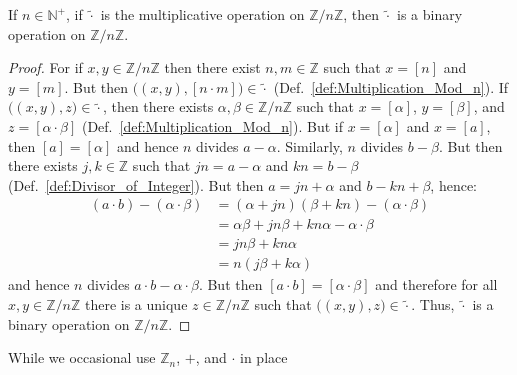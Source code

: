 \documentclass{article}                                                        %
\begin{document}
            \begin{theorem}
                \label{thm:Mult_Mod_n_is_Bin_Op}%
                If $n\in\mathbb{N}^{+}$, if $\tilde{\cdot}$ is the
                multiplicative operation on $\mathbb{Z}/n\mathbb{Z}$, then
                $\tilde{\cdot}$ is a binary operation on
                $\mathbb{Z}/n\mathbb{Z}$.
            \end{theorem}
            \begin{proof}
                For if $x,y\in\mathbb{Z}/n\mathbb{Z}$ then there exist
                $n,m\in\mathbb{Z}$ such that $x=[n]$ and $y=[m]$. But then
                $\big((x,y),[n\cdot{m}]\big)\in\tilde{\cdot}$
                (Def.~\ref{def:Multiplication_Mod_n}). If
                $\big((x,y),z\big)\in\tilde{\cdot}$, then there exists
                $\alpha,\beta\in\mathbb{Z}/n\mathbb{Z}$ such that
                $x=[\alpha]$, $y=[\beta]$, and $z=[\alpha\cdot\beta]$
                (Def.~\ref{def:Multiplication_Mod_n}). But if $x=[\alpha]$ and
                $x=[a]$, then $[a]=[\alpha]$ and hence $n$ divides $a-\alpha$.
                Similarly, $n$ divides $b-\beta$. But then there exists
                $j,k\in\mathbb{Z}$ such that $jn=a-\alpha$ and $kn=b-\beta$
                (Def.~\ref{def:Divisor_of_Integer}). But then
                $a=jn+\alpha$ and $b-kn+\beta$, hence:
                \begin{subequations}
                    \begin{align}
                        (a\cdot{b})-(\alpha\cdot\beta)
                            &=(\alpha+jn)(\beta+kn)-(\alpha\cdot\beta)\\
                            &=\alpha\beta+jn\beta+kn\alpha-\alpha\cdot\beta\\
                            &=jn\beta+kn\alpha\\
                            &=n(j\beta+k\alpha)
                    \end{align}
                \end{subequations}
                and hence $n$ divides $a\cdot{b}-\alpha\cdot\beta$. But then
                $[a\cdot{b}]=[\alpha\cdot\beta]$ and therefore for all
                $x,y\in\mathbb{Z}/n\mathbb{Z}$ there is a unique
                $z\in\mathbb{Z}/n\mathbb{Z}$ such that
                $\big((x,y),z\big)\in\tilde{\cdot}$. Thus, $\tilde{\cdot}$ is a
                binary operation on $\mathbb{Z}/n\mathbb{Z}$.
            \end{proof}
            While we occasional use $\mathbb{Z}_{n}$, $+$, and $\cdot$ in place
\end{document}
